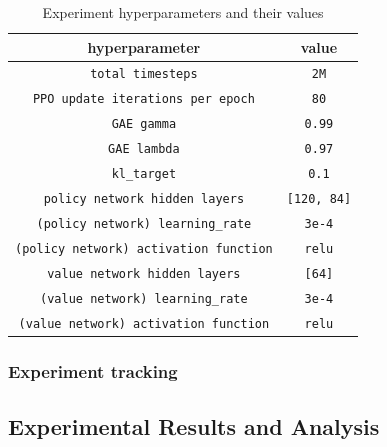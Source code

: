 \begin{table}
  \begin{center}
    \begin{tabular}{cc}
      \hline 
      hyperparameter & value \\ 
      \hline 
      \verb!total timesteps! & \verb!2M! \\
      \verb!PPO update iterations per epoch! &  \verb!80! \\
      \verb!GAE gamma! & \verb!0.99! \\
      \verb!GAE lambda! & \verb!0.97! \\
      \verb!kl_target! & \verb!0.1! \\
      \verb!policy network hidden layers! & \verb![120, 84]! \\
      \verb!(policy network) learning_rate! & \verb!3e-4! \\
      \verb!(policy network) activation function! & \verb!relu!\\
      \verb!value network hidden layers! & \verb![64]! \\
      \verb!(value network) learning_rate! & \verb!3e-4! \\
      \verb!(value network) activation function! & \verb!relu! \\
      \hline      
    \end{tabular}
  \end{center}
  \caption{Experiment hyperparameters and their values}
  \label{hyperparameters}
\end{table}




\subsubsection{Experiment tracking}
 




\subsection{Experimental Results and Analysis}


